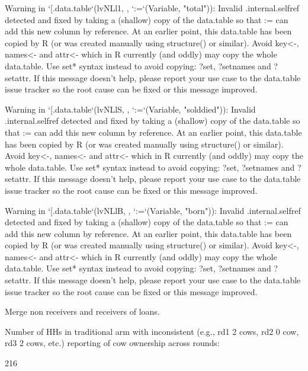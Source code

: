 \begin{Schunk}
\begin{Soutput}
Warning in `[.data.table`(lvNLl1, , `:=`(Variable, "total")): Invalid .internal.selfref detected and fixed by taking a (shallow) copy of the data.table so that := can add this new column by reference. At an earlier point, this data.table has been copied by R (or was created manually using structure() or similar). Avoid key<-, names<- and attr<- which in R currently (and oddly) may copy the whole data.table. Use set* syntax instead to avoid copying: ?set, ?setnames and ?setattr. If this message doesn't help, please report your use case to the data.table issue tracker so the root cause can be fixed or this message improved.
\end{Soutput}
\begin{Soutput}
Warning in `[.data.table`(lvNLlS, , `:=`(Variable, "solddied")): Invalid .internal.selfref detected and fixed by taking a (shallow) copy of the data.table so that := can add this new column by reference. At an earlier point, this data.table has been copied by R (or was created manually using structure() or similar). Avoid key<-, names<- and attr<- which in R currently (and oddly) may copy the whole data.table. Use set* syntax instead to avoid copying: ?set, ?setnames and ?setattr. If this message doesn't help, please report your use case to the data.table issue tracker so the root cause can be fixed or this message improved.
\end{Soutput}
\begin{Soutput}
Warning in `[.data.table`(lvNLlB, , `:=`(Variable, "born")): Invalid .internal.selfref detected and fixed by taking a (shallow) copy of the data.table so that := can add this new column by reference. At an earlier point, this data.table has been copied by R (or was created manually using structure() or similar). Avoid key<-, names<- and attr<- which in R currently (and oddly) may copy the whole data.table. Use set* syntax instead to avoid copying: ?set, ?setnames and ?setattr. If this message doesn't help, please report your use case to the data.table issue tracker so the root cause can be fixed or this message improved.
\end{Soutput}
\end{Schunk}
Merge non receivers and receivers of loans.

Number of HHs in \textsf{traditional} arm with inconsistent (e.g., rd1 2 cows, rd2 0 cow, rd3 2 cows, etc.) reporting of cow ownership across rounds:
\begin{Schunk}
\begin{Soutput}
[1] 216
\end{Soutput}
\end{Schunk}

